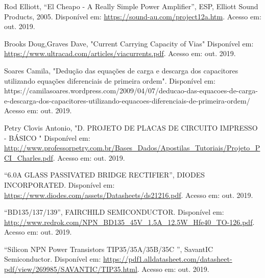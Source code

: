 \documentclass[a4paper,12pt,oneside,openany,table,xcdraw]{article}
\begin{document}
\newpage
\begin{thebibliography}{9} 
    Rod Elliott,
    “El Cheapo - A Really Simple Power Amplifier”, ESP, Elliott Sound Products, 2005.
 Disponível em:
 \url{https://sound-au.com/project12a.htm}. Acesso em: out. 2019.
 
    Brooks Doug,Graves Dave,
    "Current Carrying Capacity of Vias"
 Disponível em: 
 \url{https://www.ultracad.com/articles/viacurrents.pdf}. Acesso em: out. 2019.
 
    Soares Camila,
 "Dedução das equações de carga e descarga dos capacitores utilizando equações diferenciais de primeira ordem". 
  Disponível em: 
https://camilasoares.wordpress.com/2009/04/07/deducao-das-equacoes-de-carga-e-descarga-dos-capacitores-utilizando-equacoes-diferenciais-de-primeira-ordem/ 
Acesso em: out. 2019.
 
    Petry Clovis Antonio,
 "D. PROJETO DE PLACAS DE CIRCUITO
IMPRESSO - BÁSICO "
  Disponível em: 
 \url{http://www.professorpetry.com.br/Bases_Dados/Apostilas_Tutoriais/Projeto_PCI_Charles.pdf}. Acesso em: out. 2019.
 
 
        “6.0A GLASS PASSIVATED BRIDGE RECTIFIER”, DIODES INCORPORATED.
 Disponível em:
 \url{https://www.diodes.com/assets/Datasheets/ds21216.pdf}. Acesso em: out. 2019.
 
    “BD135/137/139”, FAIRCHILD SEMICONDUCTOR.
 Disponível em:
 \url{http://www.redrok.com/NPN_BD135_45V_1.5A_12.5W_Hfe40_TO-126.pdf}. Acesso em: out. 2019.
 
    “Silicon NPN Power Transistors TIP35/35A/35B/35C ”, SavantIC Semiconductor. 
 Disponível em:
 \url{https://pdf1.alldatasheet.com/datasheet-pdf/view/269985/SAVANTIC/TIP35.html}. Acesso em: out. 2019.
 


\end{thebibliography}
\end{document}
